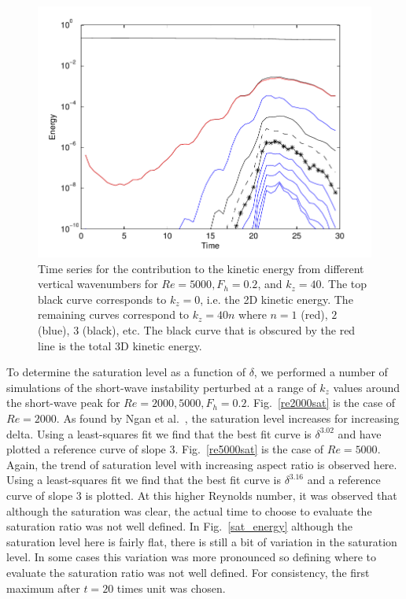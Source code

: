 \begin{figure}
\begin{center}
\includegraphics[width=\textwidth]{other_kz}
\caption{Time series for the contribution to the kinetic energy from different vertical wavenumbers for $Re=5000, F_{h}=0.2$, and $k_{z}=40$. The top black curve corresponds to $k_{z}=0$, i.e. the 2D kinetic energy. The remaining curves correspond to $k_{z} = 40n$ where $n=1$ (red), $2$ (blue), $3$ (black), etc. The black curve that is obscured by the red line is the total 3D kinetic energy.}
\label{other_kz}
\end{center}
\end{figure}

To determine the saturation level as a function of $\delta$, we performed a number of simulations of the short-wave instability perturbed at a range of $k_{z}$ values around the short-wave peak for $Re=2000,5000, F_{h}=0.2$. Fig.~\ref{re2000sat} is the case of $Re=2000$. As found by Ngan et al.\ \cite{ngan2005}, the saturation level increases for increasing delta. Using a least-squares fit we find that the best fit curve is $\delta^{3.02}$ and have plotted a reference curve of slope $3$. Fig.~\ref{re5000sat} is the case of $Re=5000$. Again, the trend of saturation level with increasing aspect ratio is observed here. Using a least-squares fit we find that the best fit curve is $\delta^{3.16}$ and a reference curve of slope $3$ is plotted. At this higher Reynolds number, it was observed that although the saturation was clear, the actual time to choose to evaluate the saturation ratio was not well defined. In Fig.~\ref{sat_energy} although the saturation level here is fairly flat, there is still a bit of variation in the saturation level. In some cases this variation was more pronounced so defining where to evaluate the saturation ratio was not well defined. For consistency, the first maximum after $t=20$ times unit was chosen. 

